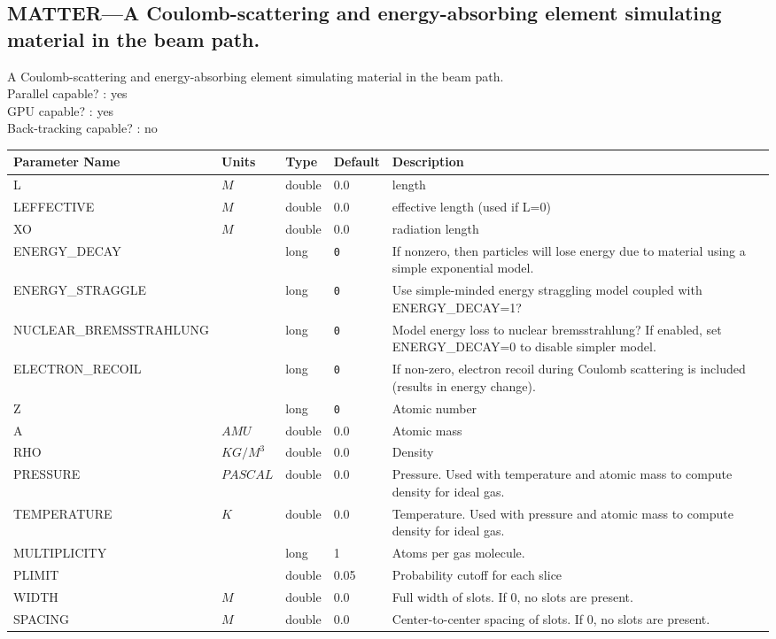 \subsection{MATTER---A Coulomb-scattering and energy-absorbing element simulating material in the beam path.}
A Coulomb-scattering and energy-absorbing element simulating material in the beam path.
\\
Parallel capable? : yes\\
GPU capable? : yes\\
Back-tracking capable? : no\\
\begin{tabular}{|l|l|l|l|p{\descwidth}|} \hline
Parameter Name & Units & Type & Default & Description \\ \hline 
L & $M$ & double &  0.0 & length  \\ \hline 
LEFFECTIVE & $M$ & double &  0.0 & effective length (used if L=0)  \\ \hline 
XO & $M$ & double &  0.0 & radiation length  \\ \hline 
ENERGY\_DECAY &  & long &  \verb|0| & If nonzero, then particles will lose energy due to material using a simple exponential model.  \\ \hline 
ENERGY\_STRAGGLE &  & long &  \verb|0| & Use simple-minded energy straggling model coupled with ENERGY\_DECAY=1?  \\ \hline 
NUCLEAR\_BREMSSTRAHLUNG &  & long &  \verb|0| & Model energy loss to nuclear bremsstrahlung? If enabled, set ENERGY\_DECAY=0 to disable simpler model.  \\ \hline 
ELECTRON\_RECOIL &  & long &  \verb|0| & If non-zero, electron recoil during Coulomb scattering is included (results in energy change).  \\ \hline 
Z &  & long &  \verb|0| & Atomic number  \\ \hline 
A & $AMU$ & double &  0.0 & Atomic mass  \\ \hline 
RHO & $KG/M^3$ & double &  0.0 & Density  \\ \hline 
PRESSURE & $PASCAL$ & double &  0.0 & Pressure. Used with temperature and atomic mass to compute density for ideal gas.  \\ \hline 
TEMPERATURE & $K$ & double &  0.0 & Temperature. Used with pressure and atomic mass to compute density for ideal gas.  \\ \hline 
MULTIPLICITY &  & long &   1               & Atoms per gas molecule.  \\ \hline 
PLIMIT &  & double &   0.05 & Probability cutoff for each slice  \\ \hline 
WIDTH & $M$ & double &  0.0 & Full width of slots. If 0, no slots are present.  \\ \hline 
SPACING & $M$ & double &  0.0 & Center-to-center spacing of slots. If 0, no slots are present.  \\ \hline 
\end{tabular}

